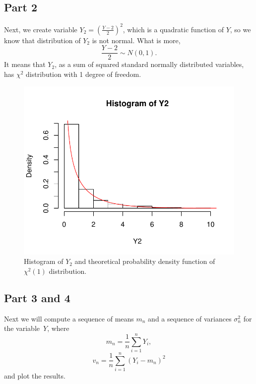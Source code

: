 \documentclass[12pt, a4paper]{article}\usepackage[]{graphicx}\usepackage[]{color}
\makeatletter
\def\maxwidth{ %
  \ifdim\Gin@nat@width>\linewidth
    \linewidth
  \else
    \Gin@nat@width
  \fi
}
\newenvironment{knitrout}{}{} %
\makeatother
\begin{document}
\subsection{Part 2}
Next, we create variable $Y_2 = \left( \frac{Y-2}{2} \right)^2$, which is a quadratic function of $Y$, so we know that distribution of $Y_2$ is not normal. What is more, 
\[\frac{Y-2}{2} \sim N(0,1).\] 
It means that $Y_2$, as a sum of squared standard normally distributed variables, has $\chi^2$ distribution with 1 degree of freedom.
\begin{knitrout}
\color{fgcolor}\begin{figure}[H]

{\centering \includegraphics[width=\maxwidth]{figure/ex1_2hist-1} 

}

\caption[Histogram of $Y_2$ and theoretical probability density function of $\chi^2(1)$ distribution]{Histogram of $Y_2$ and theoretical probability density function of $\chi^2(1)$ distribution.}\label{fig:ex1.2hist}
\end{figure}


\end{knitrout}


\subsection{Part 3 and 4}
Next we will compute a sequence of means $m_n$ and a sequence of variances $\sigma_n^2$ for the variable~$Y$, where
\[ m_n = \frac{1}{n} \sum_{i=1}^{n} Y_i, \]
\[ v_n = \frac{1}{n} \sum_{i=1}^{n} (Y_i - m_n)^2 \]
and plot the results.
\end{document}
